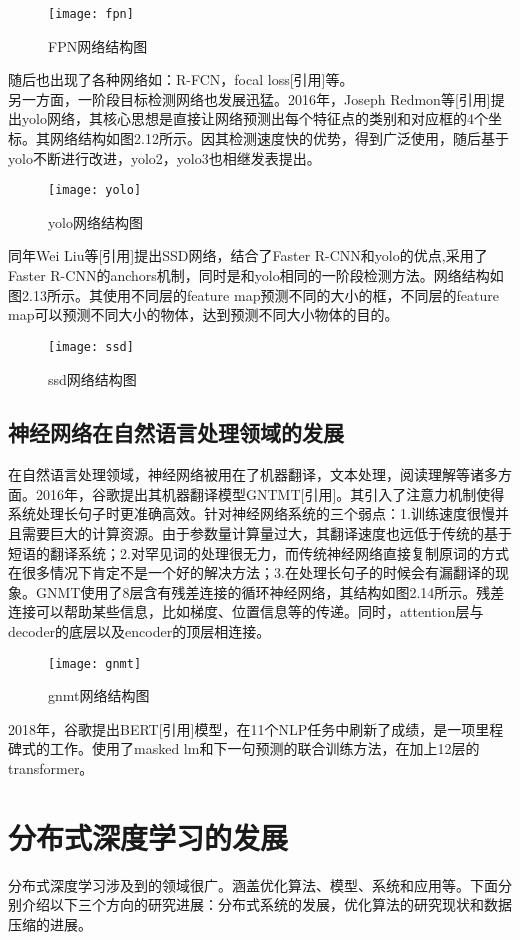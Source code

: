 \begin{figure}[htp]
\centering
\texttt{[image: fpn]}
\caption{FPN网络结构图}
\end{figure}
随后也出现了各种网络如：R-FCN，focal loss[引用]等。\\
另一方面，一阶段目标检测网络也发展迅猛。2016年，Joseph Redmon等[引用]提出yolo网络，其核心思想是直接让网络预测出每个特征点的类别和对应框的4个坐标。其网络结构如图2.12所示。因其检测速度快的优势，得到广泛使用，随后基于yolo不断进行改进，yolo2，yolo3也相继发表提出。\\
\begin{figure}[htp]
\centering
\texttt{[image: yolo]}
\caption{yolo网络结构图}
\end{figure}
同年Wei Liu等[引用]提出SSD网络，结合了Faster R-CNN和yolo的优点,采用了Faster R-CNN的anchors机制，同时是和yolo相同的一阶段检测方法。网络结构如图2.13所示。其使用不同层的feature map预测不同的大小的框，不同层的feature map可以预测不同大小的物体，达到预测不同大小物体的目的。\\
\begin{figure}[htp]
\centering
\texttt{[image: ssd]}
\caption{ssd网络结构图}
\end{figure}
\subsection{神经网络在自然语言处理领域的发展}
在自然语言处理领域，神经网络被用在了机器翻译，文本处理，阅读理解等诸多方面。2016年，谷歌提出其机器翻译模型GNTMT[引用]。其引入了注意力机制使得系统处理长句子时更准确高效。针对神经网络系统的三个弱点：1.训练速度很慢并且需要巨大的计算资源。由于参数量计算量过大，其翻译速度也远低于传统的基于短语的翻译系统；2.对罕见词的处理很无力，而传统神经网络直接复制原词的方式在很多情况下肯定不是一个好的解决方法；3.在处理长句子的时候会有漏翻译的现象。GNMT使用了8层含有残差连接的循环神经网络，其结构如图2.14所示。残差连接可以帮助某些信息，比如梯度、位置信息等的传递。同时，attention层与decoder的底层以及encoder的顶层相连接。\\
\begin{figure}[htp]
\centering
\texttt{[image: gnmt]}
\caption{gnmt网络结构图}
\end{figure}
2018年，谷歌提出BERT[引用]模型，在11个NLP任务中刷新了成绩，是一项里程碑式的工作。使用了masked lm和下一句预测的联合训练方法，在加上12层的transformer。\\
\section{分布式深度学习的发展}
分布式深度学习涉及到的领域很广。涵盖优化算法、模型、系统和应用等。下面分别介绍以下三个方向的研究进展：分布式系统的发展，优化算法的研究现状和数据压缩的进展。\\
